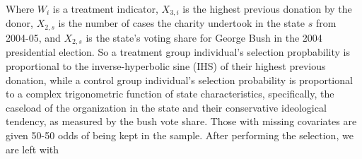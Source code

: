 \documentclass{article}
\begin{document}
Where $W_i$ is a treatment indicator, $X_{3,i}$ is the highest previous donation by the donor, $X_{2,s}$ is the number of cases the charity undertook in the state $s$ from 2004-05, and $X_{2,s}$ is the state's voting share for George Bush in the 2004 presidential election.
So a treatment group individual's selection propbability is proportional to the inverse-hyperbolic sine (IHS) of their highest previous donation, while a control group individual's selection probability is proportional to a complex trigonometric function of state characteristics, specifically, the caseload of the organization in the state and their conservative ideological tendency, as measured by the bush vote share. Those with missing covariates are given 50-50 odds of being kept in the sample.
After performing the selection, we are left with 
\end{document}
